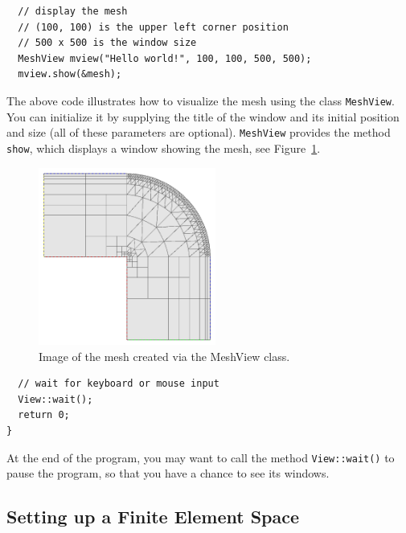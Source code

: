 \documentclass[11pt]{article}
\begin{document}
\lstset{language=C++}
\begin{lstlisting}
  // display the mesh
  // (100, 100) is the upper left corner position
  // 500 x 500 is the window size
  MeshView mview("Hello world!", 100, 100, 500, 500);
  mview.show(&mesh);
\end{lstlisting}
The above code illustrates how to visualize the mesh using the class {\tt MeshView}.
You can initialize it by supplying the title of the window and its initial position and size (all of these
parameters are optional). {\tt MeshView} provides the method {\tt show}, which
displays a window showing the mesh, see Figure~\ref{fig:meshview}.

\begin{figure}[h!]
  \centering\medskip
  \includegraphics[width=0.52\textwidth]{img/meshview2.png}
  \caption{Image of the mesh created via the MeshView class.}
  \label{fig:meshview}
\end{figure}

\lstset{language=C++}
\begin{lstlisting}
  // wait for keyboard or mouse input
  View::wait();
  return 0;
}
\end{lstlisting}
At the end of the program, you may want to call the method {\tt View::wait()} to pause
the program, so that you have a chance to see its windows.


\subsection{Setting up a Finite Element Space}
\end{document}
